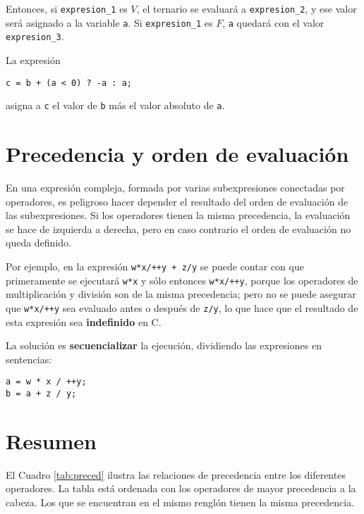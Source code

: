 Entonces, si \lstinline{expresion_1} es $V$, el ternario se evaluará a \lstinline{expresion_2}, y ese valor será asignado a la variable \lstinline{a}. Si \lstinline{expresion_1} es $F$, \lstinline{a} quedará con el valor \lstinline{expresion_3}.

\begin{ejemplo}
La expresión
\begin{lstlisting}
c = b + (a < 0) ? -a : a;   
\end{lstlisting}      
asigna a \lstinline{c} el valor de \lstinline{b} más el valor absoluto de \lstinline{a}.
\end{ejemplo}

\section{Precedencia y orden de evaluación}

En una expresión compleja, formada por varias subexpresiones conectadas por operadores, es peligroso hacer depender el resultado del orden de evaluación de las subexpresiones. Si los operadores tienen la misma precedencia, la evaluación se hace de izquierda a derecha, pero en caso contrario el orden de evaluación no queda definido. 

Por ejemplo, en la expresión \lstinline{w*x/++y + z/y} se puede contar con que primeramente se ejecutará \lstinline{w*x} y sólo entonces \lstinline{w*x/++y}, porque los operadores de multiplicación y división son de la misma precedencia; pero no se puede asegurar que \lstinline{w*x/++y} sea evaluado antes o después de \lstinline{z/y}, lo que hace que el resultado de esta expresión sea \textbf{indefinido} en C. 

La solución es \textbf{secuencializar} la ejecución, dividiendo las expresiones en sentencias:
\begin{lstlisting}
a = w * x / ++y;
b = a + z / y;     	
\end{lstlisting}
 
\section{Resumen}

El Cuadro \ref{tab:preced} ilustra las relaciones de precedencia entre los diferentes operadores. La tabla está ordenada con los operadores de mayor precedencia a la cabeza. Los que se encuentran en el mismo renglón tienen la misma precedencia.

